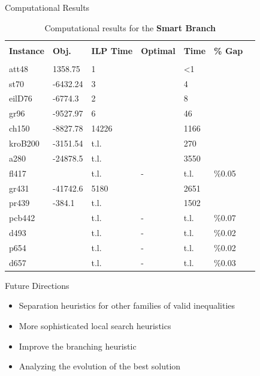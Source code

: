 \begin{frame}[t]{Computational Results}
    \begin{table}
        \begin{center}
            \resizebox{.75\textwidth}{!}
            {
                \begin{tabular}{l l l l l l l}
                    \hline \\
                    \textbf{Instance}	&	\textbf{Obj.}	&	\textbf{ILP Time}	&	\textbf{Optimal}	&	\textbf{Time}	&	\textbf{\% Gap}	& \\
                    \hline \\
                    att48		&	1358.75		&	1		&	\checkmark	&	<1		&			&	\\
                    st70		&	-6432.24	&	3		&	\checkmark	&	4		&			&	\\
                    eilD76		&	-6774.3		&	2		&	\checkmark	&	8		&			&	\\
                    gr96		&	-9527.97	&	6		&	\checkmark	&	46		&			&	\\
                    ch150		&	-8827.78	&	14226	&	\checkmark	&	1166	&			&	\\
                    kroB200		&	-3151.54	&	t.l.	&	\checkmark	&	270		&			&	\\
                    a280		&	-24878.5	&	t.l.	&	\checkmark	&	3550	&			&	\\
                    fl417		&				&	t.l.	&	-			&	t.l.	&	\%0.05	&	\\
                    gr431		&	-41742.6	&	5180	&	\checkmark	&	2651	&			&	\\
                    pr439		&	-384.1		&	t.l.	&	\checkmark	&	1502	&			&	\\
                    pcb442		&				&	t.l.	&	-			&	t.l.	&	\%0.07	&	\\
                    d493		&				&	t.l.	&	-			&	t.l.	&	\%0.02	&	\\
                    p654		&				&	t.l.	&	-			&	t.l.	&	\%0.02	&	\\
                    d657		&				&	t.l.	&	-			&	t.l.	&	\%0.03	&	\\
                    \hline
                \end{tabular} }
            \caption{Computational results for the \textbf{Smart Branch}} \label{tbl:results3}
        \end{center}
    \end{table}
\end{frame}

\begin{frame}[t]{Future Directions}
    \begin{itemize}
        \item<1-> Separation heuristics for other families of valid inequalities
        \item<2-> More sophisticated local search heuristics
        \item<3-> Improve the branching heuristic
        \item<4-> Analyzing the evolution of the best solution
    \end{itemize}
\end{frame}

